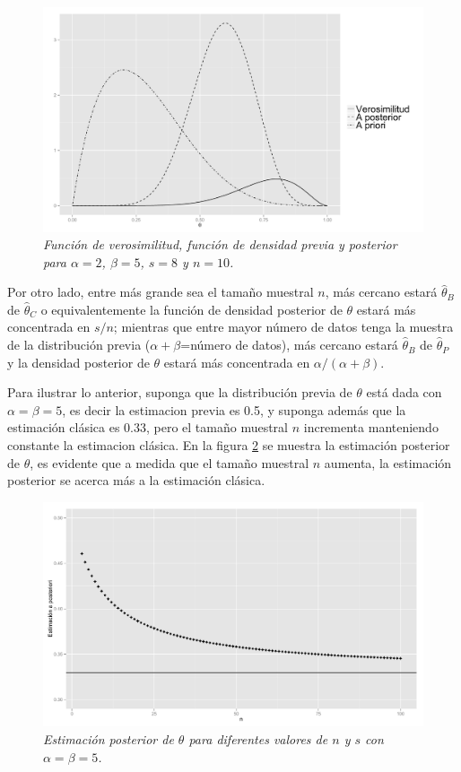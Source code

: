     \begin{figure}[!h]
    \centering
    \includegraphics[scale=0.4]{Beta_tres.pdf}
    \caption{\emph{Funci\'on de verosimilitud, funci\'on de densidad previa y posterior para $\alpha=2$, $\beta=5$, $s=8$ y $n=10$.}}
    \label{beta3}
    \end{figure}
    
    Por otro lado, entre m\'as grande sea el tama\~no muestral $n$, m\'as cercano estar\'a $\hat{\theta}_{B}$ de $\hat{\theta}_{C}$ o equivalentemente la funci\'on de densidad posterior de $\theta$ estar\'a m\'as concentrada en $s/n$; mientras que entre mayor n\'umero de datos tenga la muestra de la distribuci\'on previa ($\alpha+\beta$=n\'umero de datos), m\'as cercano estar\'a $\hat{\theta}_{B}$ de $\hat{\theta}_{P}$ y la densidad posterior de $\theta$ estar\'a m\'as concentrada en $\alpha/(\alpha+\beta)$.
    
    Para ilustrar lo anterior, suponga que la distribuci\'on previa de $\theta$ est\'a dada con $\alpha=\beta=5$, es decir la estimacion previa es 0.5, y suponga adem\'as que la estimaci\'on cl\'asica es 0.33, pero el tama\~no muestral $n$ incrementa manteniendo constante la estimacion cl\'asica. En la figura \ref{betan} se muestra la estimaci\'on posterior de $\theta$, es evidente que a medida que el tama\~no muestral $n$ aumenta, la estimaci\'on posterior se acerca m\'as a la estimaci\'on cl\'asica.
    
    \begin{figure}[!h]
    \centering
    \includegraphics[scale=0.35]{Beta_n_aumen.pdf}
    \caption{\emph{Estimaci\'on posterior de $\theta$ para diferentes valores de $n$ y $s$ con $\alpha=\beta=5$.}}
    \label{betan}
    \end{figure}
    
